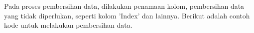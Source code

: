 Pada proses pembersihan data, dilakukan penamaan kolom, pembersihan data yang tidak diperlukan, seperti kolom 'Index' dan lainnya. Berikut adalah contoh kode untuk melakukan pembersihan data.
